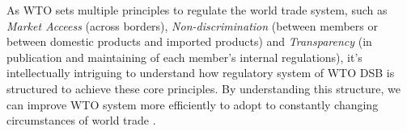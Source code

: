As WTO sets multiple principles to regulate the world trade system, 
such as \textit{Market Acceess} (across borders), 
\textit{Non-discrimination} (between members 
or between domestic products and imported products) 
and \textit{Transparency} (in publication and maintaining 
of each member's internal regulations), 
it's intellectually intriguing 
to understand how regulatory system of WTO DSB
is structured to achieve these core principles.
By understanding this structure, 
we can improve WTO system more efficiently to adopt to constantly 
changing circumstances of world trade
\citep{FREDEBEULKREIN1999625, shaffer_2004, 10.1093/jiel/jgm028}.




